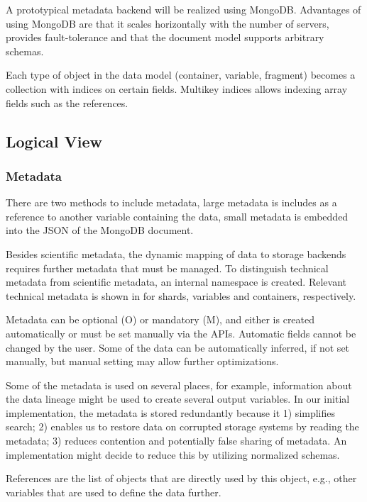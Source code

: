 
A prototypical metadata backend will be realized using MongoDB.
Advantages of using MongoDB are that it scales horizontally with the number of servers, provides fault-tolerance and that the document model supports arbitrary schemas.


Each type of object in the data model (container, variable, fragment) becomes a collection with indices on certain fields.
Multikey indices allows indexing array fields such as the references.



\subsection{Logical View}
\label{backend: mongo/logical}

\subsubsection{Metadata}

There are two methods to include metadata, large metadata is includes as a reference to another variable containing the data, small metadata is embedded into the JSON of the MongoDB document.

Besides scientific metadata, the dynamic mapping of data to storage backends requires further metadata that must be managed.
To distinguish technical metadata from scientific metadata, an internal namespace is created.
Relevant technical metadata is shown in  for shards, variables and containers, respectively.

Metadata can be optional (O) or mandatory (M), and either is created automatically or must be set manually via the APIs.
Automatic fields cannot be changed by the user.
Some of the data can be automatically inferred, if not set manually, but manual setting may allow further optimizations.

Some of the metadata is used on several places, for example, information about the data lineage might be used to create several output variables.
In our initial implementation, the metadata is stored redundantly because it
1) simplifies search; 2) enables us to restore data on corrupted storage systems by reading the metadata; 3) reduces contention and potentially false sharing of metadata.
An implementation might decide to reduce this by utilizing normalized schemas.

References are the list of objects that are directly used by this object, e.g., other variables that are used to define the data further.

